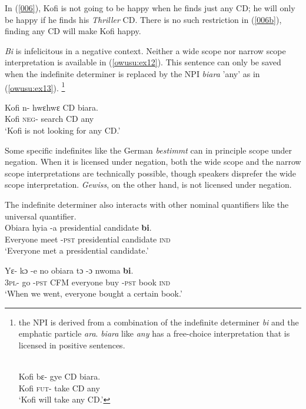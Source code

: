 \documentclass[output=paper,modfonts,nonflat,draftmode]{langsci/langscibook}
\begin{document}
In (\ref{006}), Kofi is not going to be happy when he finds just any CD; he will only be happy if he finds his \emph{Thriller} CD. There is no such restriction in (\ref{006b}), finding any CD will make Kofi happy.

\emph{Bi} is infelicitous in a negative context. Neither a wide scope nor narrow scope interpretation is available in (\ref{owusu:ex12}). This sentence can only be saved when the indefinite determiner is replaced by the NPI \emph{biara} 'any' as in (\ref{owusu:ex13}). \footnote{the NPI is derived from a combination of the indefinite determiner \emph{bi} and the emphatic particle \emph{ara}. \emph{biara} like \emph{any} has a free-choice interpretation that is licensed in positive sentences.

\ea
{}\\
\label{owusu:ex120}
\gll  Kofi  bε- gye CD biara.\\
Kofi \textsc{fut}-  take CD any \\
\glt `Kofi will take any CD.'
\z 
}  
\ea
{}\\


\ex\label{owusu:ex13}
\gll  Kofi n- hwεhwε CD biara.\\
Kofi \textsc{neg}-  search CD any \\
\glt `Kofi is not looking for any CD.'
\z \z 

Some specific indefinites like the German \emph{bestimmt} can in principle scope under negation. When it is licensed under negation, both the wide scope and the narrow scope interpretations are technically possible, though speakers disprefer the wide scope interpretation. \emph{Gewiss}, on the other hand, is not licensed under negation.

The indefinite determiner also interacts with other nominal quantifiers like the universal quantifier. 
\ea 
{}\\
  \ea\label{owusu:ex100}
\gll Obiara hyia -a presidential candidate  \textbf{bi}. \\
    Everyone meet -\textsc{pst} presidential candidate \textsc{ind} \\
\glt `Everyone met a presidential candidate.'

\ex\label{owusu:ex15}
\gll  Yε- kɔ -e no obiara tɔ -ɔ  nwoma \textbf{bi}.\\
3\textsc{pl}- go -\textsc{pst}  CFM everyone buy -\textsc{pst} book \textsc{ind} \\
\glt `When we went, everyone bought a certain book.'
\z \z
 
\end{document}
